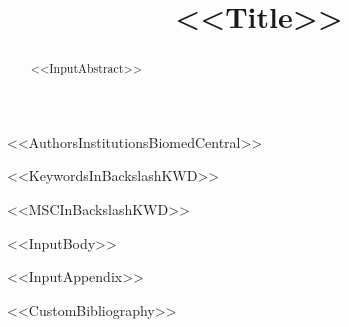 \documentclass[%
<<DocumentClassOptions>>]{bmcart}
\begin{document}
\begin{frontmatter}
\begin{fmbox}


\title{<<Title>>}

<<AuthorsInstitutionsBiomedCentral>>

\begin{artnotes}
\end{artnotes}

\end{fmbox}

\begin{abstractbox}
\begin{abstract}
<<InputAbstract>>
\end{abstract}

\begin{keyword}
<<KeywordsInBackslashKWD>>
\end{keyword}

\begin{keyword}[class=AMS]
<<MSCInBackslashKWD>>
\end{keyword}
\end{abstractbox}

\end{frontmatter}

<<InputBody>>

\appendix
<<InputAppendix>>


<<CustomBibliography>>
\end{document}
